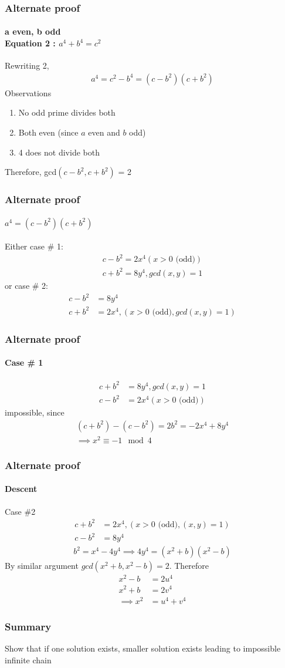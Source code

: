 \documentclass{beamer}
\begin{document}
\begin{frame}
    \frametitle{Alternate proof}
    \framesubtitle{a even, b odd\\ Equation 2 : $a^4+b^4=c^2$}
    Rewriting 2,
    \begin{gather}
        a^4 = c^2 - b^4 = (c - b^2)(c + b^2)
    \end{gather}
    Observations
    \begin{enumerate}
        \item No odd prime divides both
        \item Both even (since $a$ even and $b$ odd)
        \item 4 does not divide both
    \end{enumerate}
    Therefore, gcd$(c-b^2, c+b^2)$ = 2\\
\end{frame}

\begin{frame}
    \frametitle{Alternate proof}
    \framesubtitle{$a^4 = (c - b^2)(c + b^2)$}
    Either case \# 1:
    \begin{gather}
        c - b^2 = 2x^4(x > 0 \textrm{ (odd)})\\
        c + b^2 = 8y^4, gcd(x, y) = 1
    \end{gather}
    or case \# 2:
    \begin{align}
        c - b^2 &= 8y^4\\
        c + b^2 &= 2x^4,(x > 0 \textrm{ (odd)}, gcd(x, y) = 1)
    \end{align}
\end{frame}

\begin{frame}
    \frametitle{Alternate proof}
    \framesubtitle{Case \# 1}
    \begin{align}
        c + b^2 &= 8y^4, gcd(x, y) = 1\\
        c - b^2 &= 2x^4(x > 0 \textrm{ (odd)})
    \end{align}
    impossible, since
    \begin{gather*}
        (c + b^2) - (c - b^2) = 2b^2 = -2x^4 + 8y^4\\
        \implies x^2\equiv -1\mod 4
    \end{gather*}
\end{frame}

\begin{frame}
    \frametitle{Alternate proof}
    \framesubtitle{Descent}
    Case \#2
    \begin{align}
        c + b^2 &= 2x^4,(x > 0 \textrm{ (odd)}, (x, y) = 1)\\
        c - b^2 &= 8y^4
    \end{align}
    \begin{gather*}
        b^2 = x^4 - 4y^4\implies 4y^4 = (x^2+b)(x^2-b)
    \end{gather*}
    By similar argument $gcd(x^2+b, x^2-b) = 2$. Therefore
    \begin{align}
        x^2-b &= 2u^4\\
        x^2+b &= 2v^4\\
        \implies x^2 &= u^4 + v^4
    \end{align}
\end{frame}

\begin{frame}
    \frametitle{Summary}
    Show that if one solution exists, smaller solution exists leading to
    impossible infinite chain
\end{frame}
\end{document}
